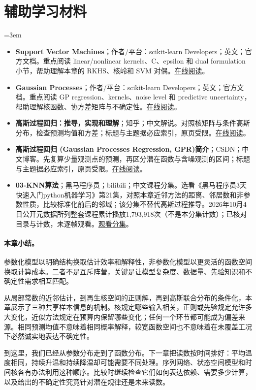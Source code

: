 \section*{辅助学习材料}
\begingroup
\emergencystretch=3em
\begin{itemize}
\item \textbf{Support Vector Machines}；作者/平台：scikit-learn Developers；英文；官方文档。重点阅读 linear/nonlinear kernels、C、epsilon 和 dual formulation 小节，帮助理解本章的 RKHS、核岭和 SVM 对偶。\href{https://scikit-learn.org/stable/modules/svm.html}{在线阅读}。
\item \textbf{Gaussian Processes}；作者/平台：scikit-learn Developers；英文；官方文档。重点阅读 GP regression、kernels、noise level 和 predictive uncertainty，帮助理解核函数、协方差矩阵与不确定性。\href{https://scikit-learn.org/stable/modules/gaussian\_process.html}{在线阅读}。
\item \textbf{高斯过程回归：推导，实现和理解}；知乎；中文解说。对照核矩阵与条件高斯分布，检查预测均值和方差；标题与主题据必应索引，原页受限。\href{https://zhuanlan.zhihu.com/p/104601803}{在线阅读}。
\item \textbf{高斯过程回归 (Gaussian Processes Regression, GPR)简介}；CSDN；中文博客。先复算少量观测点的预测，再区分潜在函数与含噪观测的区间；标题与主题据必应索引，原页受限。\href{https://blog.csdn.net/HelloWorldTM/article/details/126980872}{在线阅读}。
\item \textbf{03-KNN算法}；黑马程序员；bilibili；中文课程分集。选看《黑马程序员3天快速入门python机器学习》第21集，对照本章近邻方法的距离、邻居数和非参数性质，比较标准化前后的邻域；该分集不替代高斯过程推导。2026年10月4日公开元数据所列整套课程累计播放1,793,918次（不是本分集计数）；已核对目录与计数，未逐帧观看。\href{https://www.bilibili.com/video/BV1nt411r7tj/?p=21}{观看分集}。
\end{itemize}
\endgroup
\paragraph{本章小结。}
参数化模型以明确结构换取估计效率和解释性，非参数化模型以更灵活的函数空间换取计算成本。二者不是互斥阵营，关键是让模型复杂度、数据量、先验知识和不确定性需求相互匹配。

从局部常数的近邻估计，到再生核空间的正则解，再到高斯联合分布的条件化，本章展示了三种共享样本信息的机制。核规定哪些输入相关，正则或先验规定允许多大变化，近似方法规定在预算内保留哪些变化；任何一个环节都可能成为偏差来源。相同预测均值不意味着相同概率解释，较宽函数空间也不意味着在未覆盖工况下必然诚实地表达不确定性。

到这里，我们已经从参数分布走到了函数分布。下一章把读数按时间排好：平均温度相同，持续升温和持续降温却可能需要不同处理。序列网络、状态空间模型和时间核各有办法利用这种顺序。比较时继续检查它们如何表达依赖、需要多少计算，以及给出的不确定性究竟针对潜在规律还是未来读数。
